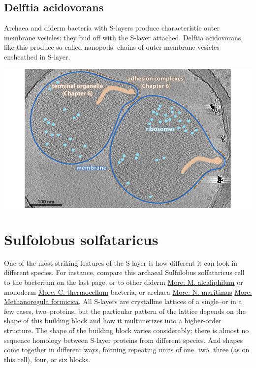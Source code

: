\documentclass[]{tufte-book}
\begin{document}
\hypertarget{Nanopods}{\subsection{Delftia acidovorans}\label{Nanopods}}

Archaea and diderm bacteria with S-layers produce characteristic outer
membrane vesicles: they bud off with the S-layer attached. Delftia
acidovorans, like this produce so-called nanopods: chains of outer
membrane vesicles ensheathed in S-layer.

\includegraphics{img/02_static/2_1_Mgenitalium}

\section{Sulfolobus solfataricus}\label{sulfolobus-solfataricus}

One of the most striking features of the S-layer is how different it can
look in different species. For instance, compare this archaeal
Sulfolobus solfataricus cell to the bacterium on the last page, or to
other diderm \protect\hyperlink{M._alcaliphilum}{More: M. alcaliphilum}
or monoderm \protect\hyperlink{}{More: C. thermocellum} bacteria, or
archaea \protect\hyperlink{N._maritimus}{More: N. maritimus}
\protect\hyperlink{Methanoregula_formicica}{More: Methanoregula
formicica}. All S-layers are crystalline lattices of a single--or in a
few cases, two--proteins, but the particular pattern of the lattice
depends on the shape of this building block and how it multimerizes into
a higher-order structure. The shape of the building block varies
considerably; there is almost no sequence homology between S-layer
proteins from different species. And shapes come together in different
ways, forming repeating units of one, two, three (as on this cell),
four, or six blocks.
\end{document}
